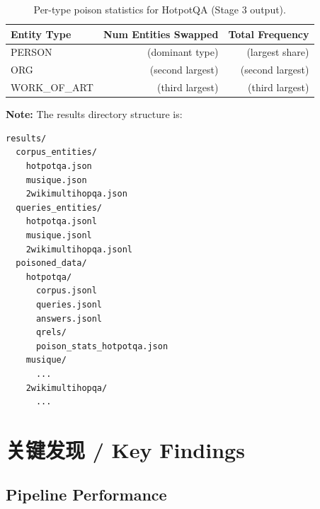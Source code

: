 \documentclass[11pt,a4paper]{article}
\begin{document}
\begin{table}[H]
\centering
\caption{Per-type poison statistics for HotpotQA (Stage 3 output).}
\begin{tabular}{l r r}
\toprule
\textbf{Entity Type} & \textbf{Num Entities Swapped} & \textbf{Total Frequency} \\
\midrule
PERSON        & (dominant type) & (largest share) \\
ORG           & (second largest) & (second largest) \\
WORK\_OF\_ART & (third largest) & (third largest) \\
\bottomrule
\end{tabular}
\end{table}

\textbf{Note:} The results directory structure is:
\begin{lstlisting}[language=bash]
results/
  corpus_entities/
    hotpotqa.json
    musique.json
    2wikimultihopqa.json
  queries_entities/
    hotpotqa.jsonl
    musique.jsonl
    2wikimultihopqa.jsonl
  poisoned_data/
    hotpotqa/
      corpus.jsonl
      queries.jsonl
      answers.jsonl
      qrels/
      poison_stats_hotpotqa.json
    musique/
      ...
    2wikimultihopqa/
      ...
\end{lstlisting}

\section{关键发现 / Key Findings}

\subsection{Pipeline Performance}
\end{document}
